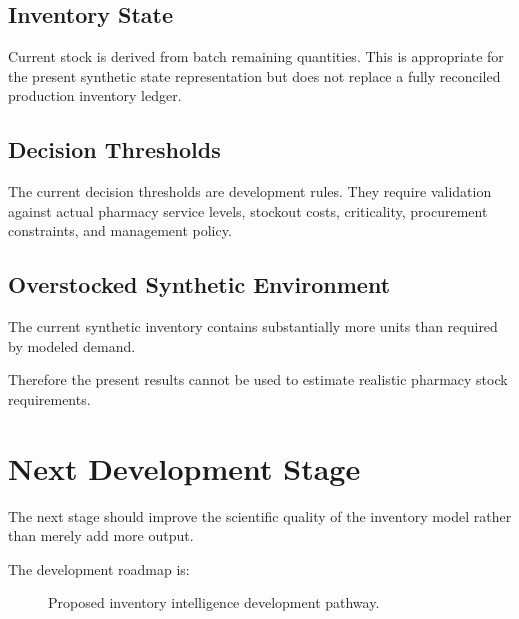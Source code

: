 \documentclass[11pt,a4paper]{article}
\begin{document}
\subsection{Inventory State}

Current stock is derived from batch remaining quantities. This is
appropriate for the present synthetic state representation but does
not replace a fully reconciled production inventory ledger.

\subsection{Decision Thresholds}

The current decision thresholds are development rules. They require
validation against actual pharmacy service levels, stockout costs,
criticality, procurement constraints, and management policy.

\subsection{Overstocked Synthetic Environment}

The current synthetic inventory contains substantially more units
than required by modeled demand.

Therefore the present results cannot be used to estimate realistic
pharmacy stock requirements.

\section{Next Development Stage}

The next stage should improve the scientific quality of the inventory
model rather than merely add more output.

The development roadmap is:

\begin{figure}[H]
\centering


\caption{Proposed inventory intelligence development pathway.}
\end{figure}
\end{document}
